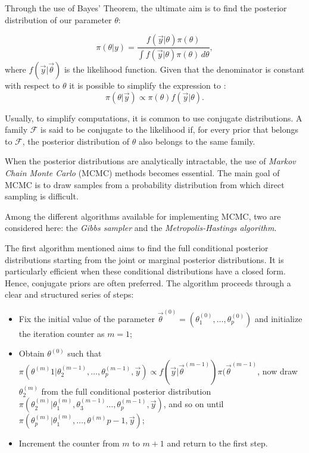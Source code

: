 \documentclass{Class/julia}
\begin{document}
Through the use of Bayes' Theorem, the ultimate aim is to find the posterior distribution of our parameter \( \theta \):

\[
\pi(\theta | y) = \frac{f(\vec y | \theta) \pi(\theta)}{\int f(\vec y | \theta) \pi(\theta) \, d\theta},
\]
where \(f(\vec y|\vec \theta)\) is the likelihood function. Given that the denominator is constant with respect to \(\theta\) it is possible to simplify the expression to :
\[
\pi(\theta|\vec y) \propto \pi(\theta)f(\vec y | \theta).
\]

Usually, to simplify computations, it is common to use conjugate distributions. A family \( \mathcal{F} \) is said to be conjugate to the likelihood if, for every prior that belongs to \( \mathcal{F} \), the posterior distribution of \( \theta \) also belongs to the same family.

When the posterior distributions are analytically intractable, the use of \textit{Markov Chain Monte Carlo} (MCMC) methods becomes essential. The main goal of MCMC is to draw samples from a probability distribution from which direct sampling is difficult.

Among the different algorithms available for implementing MCMC, two are considered here: the \textit{Gibbs sampler} and the \textit{Metropolis-Hastings algorithm}.

The first algorithm mentioned aims to find the full conditional posterior distributions starting from the joint or marginal posterior distributions. It is particularly efficient when these conditional distributions have a closed form. Hence, conjugate priors are often preferred. The algorithm proceeds through a clear and structured series of steps:

\begin{itemize}
  \item Fix the initial value of the parameter \( \vec\theta^{(0)} = (\theta^{(0)}_1,\ldots,\theta^{(0)}_p) \) and initialize the iteration counter as \( m = 1 \);
  \item Obtain \( \theta^{(0)} \) such that \( \pi(\theta^{(m)}1|\theta^{(m-1)}_2,\ldots,\theta^{(m-1)}_p, \vec y) \propto f(\vec y|\vec\theta^{(m-1)})\pi(\vec\theta^{(m-1)} \), now draw \(\theta^{(m)}_2 \) from the full conditional posterior distribution \( \pi(\theta^{(m)}_2|\theta^{(m)}_1, \theta^{(m-1)}_3\ldots,\theta^{(m-1)}_p, \vec y) \), and so on until \(\pi(\theta^{(m)}_p|\theta^{(m)}_1,\ldots,\theta^{(m)}{p-1}, \vec y)\);
  \item Increment the counter from \( m \) to \( m + 1 \) and return to the first step.
\end{itemize}
\end{document}
